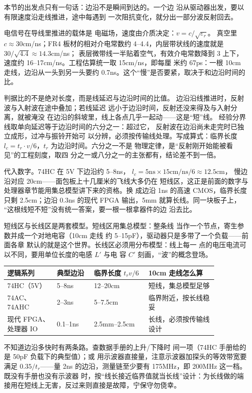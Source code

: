 本节的出发点只有一句话：边沿不是瞬间到达的。一个边
沿从驱动器出发，要以有限速度沿走线推进，途中每遇到
一次阻抗变化，就分出一部分波反射回去。

电信号在导线里推进的载体是
电磁场，速度由介质决定：$v=c/\sqrt{\varepsilon_r}$。
真空里 $c\approx30$cm/ns；FR4 板材的相对介电常数约
4--4.4，内层带状线的速度就是 $30/\sqrt{4.4}\approx14.3$cm/ns；
表层微带线一半贴着空气，有效介电常数降到 3 上下，
速度约 16--17cm/ns。工程估算统一取 15cm/ns，即每厘
米约 67ps：一根 10cm 走线，边沿从一头到另一头要约
0.7ns。这个“慢”是否要紧，取决于和边沿时间的比。

判据比的不是绝对长度，而是线延迟与边沿时间的比值。
边沿沿线推进时，反射波与入射波在途中叠加；若线延迟
远小于边沿时间，反射还没来得及与入射分离，就被淹没
在边沿的斜坡里，线上各点几乎一起动——这是“短”线。
经验分界线取单向延迟等于边沿时间的六分之一：超过它，
反射波在边沿尚未走完时已独立成形，过冲与振铃开始可
以分辨，必须按传输线处理。写成算式：临界长度
$l_c=t_r\cdot v/6$，$t_r$ 为边沿时间。六分之一不是
物理定律，是“反射刚开始能被看见”的工程刻度，取四
分之一或八分之一的主张都有，结论差不到一倍。

代入数字。74HC 在 5V 下边沿约 5--8ns，
$l_c=5\text{ns}\times15\text{cm/ns}/6\approx12.5$cm，
慢边沿对应 20cm——面包板上十几厘米的飞线大多仍在
短线区，这正是前面的数字与处理器章节能用集总模型讲下来的资格。换
成边沿 1ns 的高速 CMOS，临界长度只剩 2.5cm；边沿
0.3ns 的现代 FPGA 输出，5mm 就算长线。同一块板子上，
“这根线短不短”没有统一答案，要一根一根拿器件的边
沿去比。

短线区与长线区是两套模型。短线区用集总模型：整条线
当作一个节点，寄生参数并成一个对地电容（10cm 走线
约 5--15pF），驱动器只是多带了一个负载——前面各章
默认的就是这个世界。长线区必须用分布模型：线上每一
点的电压电流可以不同，要用单位长度的电感 $L'$ 与电
容 $C'$ 刻画，“波”的概念登场。

\begin{longtable}{L{0.2\linewidth}L{0.15\linewidth}L{0.22\linewidth}L{0.29\linewidth}}
\toprule
逻辑系列 & 典型边沿 & 临界长度 $t_r v/6$ & 10cm 走线怎么算 \\
\midrule
74HC（5V） & 5--8ns & 12--20cm & 短线，集总模型足够 \\\tablerowrule
74AC、74AHC & 2--3ns & 5--7.5cm & 临界附近，按长线稳妥 \\\tablerowrule
现代 FPGA、处理器 IO & 0.1--1ns & 2.5mm--2.5cm & 长线，必须按传输线设计 \\
\bottomrule
\end{longtable}

不知道边沿多快时有两条路。查数据手册的上升/下降时
间一项（74HC 手册给的是 50pF 负载下的典型值）；或
用示波器直接量，注意示波器加探头的等效带宽要满足
$0.35/t_r$——量 2ns 的边沿，测量链至少要有
175MHz，即 200MHz 这一档。既没有手册也没有示波器
时，按“线长接近临界值就当长线”设计：为长线做的端
接用在短线上无害，反过来则直接是故障，宁保守勿侥幸。

